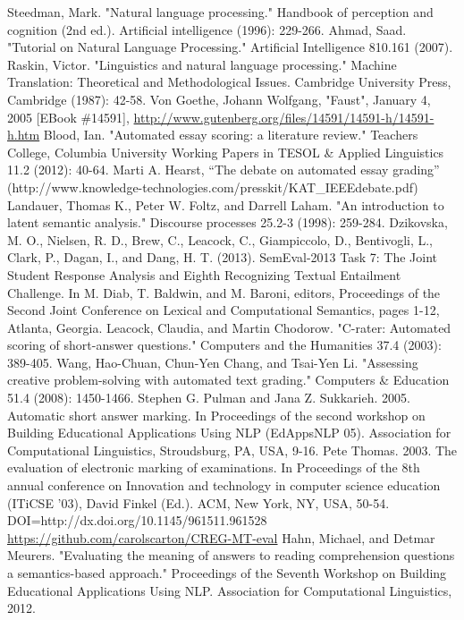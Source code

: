 \documentclass[11pt]{report}
\numberwithin{equation}{section} %
\begin{document}
\begin{thebibliography}{3}
 Steedman, Mark. "Natural language processing." Handbook of perception and cognition (2nd ed.). Artificial intelligence (1996): 229-266.
 Ahmad, Saad. "Tutorial on Natural Language Processing." Artificial Intelligence 810.161 (2007).
  Raskin, Victor. "Linguistics and natural language processing." Machine Translation: Theoretical and Methodological Issues. Cambridge University Press, Cambridge (1987): 42-58.
 Von Goethe, Johann Wolfgang, "Faust", January 4, 2005 [EBook \#14591], \url{http://www.gutenberg.org/files/14591/14591-h/14591-h.htm}
 Blood, Ian. "Automated essay scoring: a literature review." Teachers College, Columbia University Working Papers in TESOL \& Applied Linguistics 11.2 (2012): 40-64.
 Marti A. Hearst, ``The debate on automated essay grading'' (http://www.knowledge-technologies.com/presskit/KAT\_IEEEdebate.pdf) 
 Landauer, Thomas K., Peter W. Foltz, and Darrell Laham. "An introduction to latent semantic analysis." Discourse processes 25.2-3 (1998): 259-284.
 Dzikovska, M. O., Nielsen, R. D., Brew, C., Leacock, C., Giampiccolo, D., Bentivogli, L., Clark, P., Dagan, I., and Dang, H. T. (2013). SemEval-2013 Task 7: The Joint Student Response Analysis and Eighth Recognizing Textual Entailment Challenge. In M. Diab, T. Baldwin, and M. Baroni, editors, Proceedings of the Second Joint Conference on Lexical and Computational Semantics, pages 1-12, Atlanta, Georgia.
  Leacock, Claudia, and Martin Chodorow. "C-rater: Automated scoring of short-answer questions." Computers and the Humanities 37.4 (2003): 389-405.
 Wang, Hao-Chuan, Chun-Yen Chang, and Tsai-Yen Li. "Assessing creative problem-solving with automated text grading." Computers \& Education 51.4 (2008): 1450-1466.
 Stephen G. Pulman and Jana Z. Sukkarieh. 2005. Automatic short answer marking. In Proceedings of the second workshop on Building Educational Applications Using NLP (EdAppsNLP 05). Association for Computational Linguistics, Stroudsburg, PA, USA, 9-16.
 Pete Thomas. 2003. The evaluation of electronic marking of examinations. In Proceedings of the 8th annual conference on Innovation and technology in computer science education (ITiCSE '03), David Finkel (Ed.). ACM, New York, NY, USA, 50-54. DOI=http://dx.doi.org/10.1145/961511.961528
 \url{https://github.com/carolscarton/CREG-MT-eval}
 Hahn, Michael, and Detmar Meurers. "Evaluating the meaning of answers to reading comprehension questions a semantics-based approach." Proceedings of the Seventh Workshop on Building Educational Applications Using NLP. Association for Computational Linguistics, 2012.

\end{thebibliography}
\end{document}
